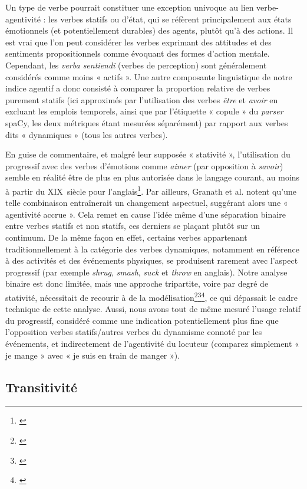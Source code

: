 Un type de verbe pourrait constituer une exception univoque au lien verbe-agentivité : les verbes statifs ou d'état, qui se réfèrent principalement aux états émotionnels (et potentiellement durables) des agents, plutôt qu'à des actions. Il est vrai que l'on peut considérer les verbes exprimant des attitudes et des sentiments propositionnels comme évoquant des formes d'action mentale. Cependant, les \textit{verba sentiendi} (verbes de perception) sont généralement considérés comme moins « actifs ». 
Une autre composante linguistique de notre indice agentif a donc consisté à comparer la proportion relative de verbes purement statifs (ici approximés par l’utilisation des verbes \textit{être} et \textit{avoir} en excluant les emplois temporels, ainsi que par l'étiquette « copule » du \textit{parser} spaCy, les deux métriques étant mesurées séparément) par rapport aux verbes dits « dynamiques » (tous les autres verbes).

En guise de commentaire, et malgré leur supposée « stativité », l'utilisation du progressif avec des verbes d'émotions comme \textit{aimer} (par opposition à \textit{savoir}) semble en réalité être de plus en plus autorisée dans le langage courant, au moins à partir du XIX\ieme ~siècle pour l’anglais\footnote{\cite{granath_im_2014}}. Par ailleurs, Granath et al. notent qu'une telle combinaison entraînerait un changement aspectuel, suggérant alors une « agentivité accrue ». Cela remet en cause l'idée même d'une séparation binaire entre verbes statifs et non statifs, ces derniers se plaçant plutôt sur un continuum. De la même façon en effet, certains verbes appartenant traditionnellement à la catégorie des verbes dynamiques, notamment en référence à des activités et des événements physiques, se produisent rarement avec l'aspect progressif (par exemple \textit{shrug}, \textit{smash}, \textit{suck} et \textit{throw} en anglais). Notre analyse binaire est donc limitée, mais une approche tripartite, voire par degré de stativité, nécessitait de recourir à de la modélisation\footnote{\cite{klavans_degrees_1992}}\footnote{\cite{friedrich_automatic_2014}}\footnote{\cite{sims_literary_2019}}, ce qui dépassait le cadre technique de cette analyse. Aussi, nous avons tout de même mesuré l'usage relatif du progressif, considéré comme une indication potentiellement plus fine que l'opposition verbes statifs/autres verbes du dynamisme connoté par les événements, et indirectement de l'agentivité du locuteur (comparez simplement « je mange » avec « je suis en train de manger »).

\subsection{Transitivité}

